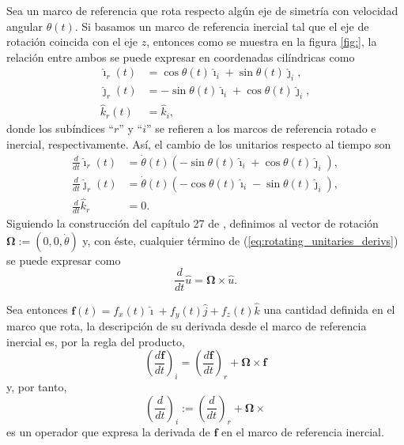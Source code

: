 
Sea un marco de referencia que rota respecto algún eje de simetría con velocidad angular $\theta(t)$. Si basamos un marco de referencia inercial tal que el eje de rotación coincida con el eje $z$, entonces como se muestra en la figura \ref{fig:}, la relación entre ambos se puede expresar en coordenadas cilíndricas como
\begin{align}
 \hat{\imath}_r(t) &= \cos \theta(t) \hat{\imath}_i + \sin \theta(t) \hat{\jmath}_i, \nonumber \\
 \hat{\jmath}_r(t) &= -\sin \theta(t) \hat{\imath}_i + \cos \theta(t) \hat{\jmath}_i, \nonumber \\
 \hat{k}_r(t) &= \hat{k}_i,
 \label{eq:rotating_unitaries}
\end{align}
donde los subíndices ``$r$'' y ``$i$'' se refieren a los marcos de referencia rotado e inercial, respectivamente. Así, el cambio de los unitarios respecto al tiempo son
\begin{align}
 \frac{d}{dt} \hat{\imath}_r(t) &= \dot{\theta}(t) \left( -\sin \theta(t) \hat{\imath}_i + \cos \theta(t) \hat{\jmath}_i  \right), \nonumber \\
 \frac{d}{dt} \hat{\jmath}_r(t) &= \dot{\theta}(t) \left( -\cos \theta(t) \hat{\imath}_i - \sin \theta(t) \hat{\jmath}_i \right), \nonumber \\
 \frac{d}{dt} \hat{k}_r &= 0.
 \label{eq:rotating_unitaries_derivs}
\end{align}
Siguiendo la construcción del capítulo 27 de \cite{Arnold1989}, definimos al vector de rotación $\mathbf{\Omega} := \left( 0, 0, \dot{\theta} \right)$ y, con éste, cualquier término de (\ref{eq:rotating_unitaries_derivs}) se puede expresar como
\begin{equation}
 \frac{d}{dt}\hat{u} = \mathbf{\Omega} \times \hat{u}.
\end{equation}

Sea entonces $\mathbf{f}(t) = f_x(t) \hat{\imath} + f_y(t) \hat{j} + f_z(t) \hat{k}$ una cantidad definida en el marco que rota, la descripción de su derivada desde el marco de referencia inercial es, por la regla del producto,
\begin{equation*}
 \left( \frac{d \mathbf{f}}{dt} \right)_i = \left( \frac{d\mathbf{f}}{dt} \right)_r  + \mathbf{\Omega} \times \mathbf{f}
\end{equation*}
y, por tanto,
\begin{equation}
 \left(\frac{d}{dt}\right)_i := \left( \frac{d}{dt} \right)_r + \mathbf{\Omega} \times
 \label{eq:rotating_derivative}
\end{equation}
es un operador que expresa la derivada de $\mathbf{f}$ en el marco de referencia inercial.

